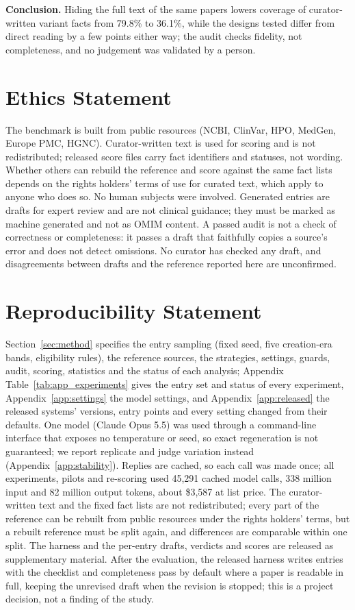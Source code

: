 \documentclass{article} %
\begin{document}
\textbf{Conclusion.} Hiding the full text of the same papers lowers coverage of curator-written variant facts from 79.8\% to 36.1\%, while the designs tested differ from direct reading by a few points either way; the audit checks fidelity, not completeness, and no judgement was validated by a person.

\section*{Ethics Statement}
The benchmark is built from public resources (NCBI, ClinVar, HPO, MedGen, Europe PMC, HGNC). Curator-written text is used for scoring and is not redistributed; released score files carry fact identifiers and statuses, not wording. Whether others can rebuild the reference and score against the same fact lists depends on the rights holders' terms of use for curated text, which apply to anyone who does so. No human subjects were involved. Generated entries are drafts for expert review and are not clinical guidance; they must be marked as machine generated and not as OMIM content. A passed audit is not a check of correctness or completeness: it passes a draft that faithfully copies a source's error and does not detect omissions. No curator has checked any draft, and disagreements between drafts and the reference reported here are unconfirmed.

\section*{Reproducibility Statement}
Section~\ref{sec:method} specifies the entry sampling (fixed seed, five creation-era bands, eligibility rules), the reference sources, the strategies, settings, guards, audit, scoring, statistics and the status of each analysis; Appendix Table~\ref{tab:app_experiments} gives the entry set and status of every experiment, Appendix~\ref{app:settings} the model settings, and Appendix~\ref{app:released} the released systems' versions, entry points and every setting changed from their defaults. One model (Claude Opus 5.5) was used through a command-line interface that exposes no temperature or seed, so exact regeneration is not guaranteed; we report replicate and judge variation instead (Appendix~\ref{app:stability}). Replies are cached, so each call was made once; all experiments, pilots and re-scoring used 45,291 cached model calls, 338 million input and 82 million output tokens, about \$3,587 at list price. The curator-written text and the fixed fact lists are not redistributed; every part of the reference can be rebuilt from public resources under the rights holders' terms, but a rebuilt reference must be split again, and differences are comparable within one split. The harness and the per-entry drafts, verdicts and scores are released as supplementary material. After the evaluation, the released harness writes entries with the checklist and completeness pass by default where a paper is readable in full, keeping the unrevised draft when the revision is stopped; this is a project decision, not a finding of the study.
\end{document}
